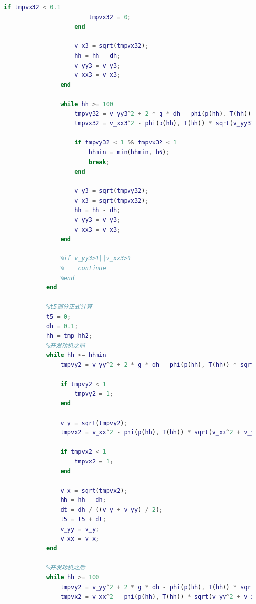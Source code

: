 \documentclass[hyperref,a4paper,UTF8]{ctexart}
\begin{document}
\begin{lstlisting}[language=Matlab]
                    if tmpvx32 < 0.1
                        tmpvx32 = 0;
                    end

                    v_x3 = sqrt(tmpvx32);
                    hh = hh - dh;
                    v_yy3 = v_y3;
                    v_xx3 = v_x3;
                end

                while hh >= 100
                    tmpvy32 = v_yy3^2 + 2 * g * dh - phi(p(hh), T(hh)) * sqrt(v_yy3^2 + v_xx3^2) * S_floor * dh * v_yy3 / (m - m_floor - m_para - m_hide) - 2 * 7500 * dh * v_yy3 / ((m - m_floor - m_para - m_hide) * sqrt(v_yy3^2 + v_xx3^2));
                    tmpvx32 = v_xx3^2 - phi(p(hh), T(hh)) * sqrt(v_yy3^2 + v_xx3^2) * S_floor * dh * v_xx3^2 / (v_yy3 * (m - m_floor - m_para - m_hide)) - 2 * 7500 * dh * v_xx3^2 / (v_yy3 * sqrt(v_yy3^2 + v_xx3^2) * (m - m_floor - m_para - m_hide));

                    if tmpvy32 < 1 && tmpvx32 < 1
                        hhmin = min(hhmin, h6);
                        break;
                    end

                    v_y3 = sqrt(tmpvy32);
                    v_x3 = sqrt(tmpvx32);
                    hh = hh - dh;
                    v_yy3 = v_y3;
                    v_xx3 = v_x3;
                end

                %if v_yy3>1||v_xx3>0
                %    continue
                %end
            end

            %t5部分正式计算
            t5 = 0;
            dh = 0.1;
            hh = tmp_hh2;
            %开发动机之前
            while hh >= hhmin
                tmpvy2 = v_yy^2 + 2 * g * dh - phi(p(hh), T(hh)) * sqrt(v_yy^2 + v_xx^2) * (S_floor + S_para) * dh * v_yy / (m - m_floor - m_para - m_hide);

                if tmpvy2 < 1
                    tmpvy2 = 1;
                end

                v_y = sqrt(tmpvy2);
                tmpvx2 = v_xx^2 - phi(p(hh), T(hh)) * sqrt(v_xx^2 + v_yy^2) * (S_floor + S_para) * dh * v_xx^2 / ((m - m_floor - m_para - m_hide) * v_yy);

                if tmpvx2 < 1
                    tmpvx2 = 1;
                end

                v_x = sqrt(tmpvx2);
                hh = hh - dh;
                dt = dh / ((v_y + v_yy) / 2);
                t5 = t5 + dt;
                v_yy = v_y;
                v_xx = v_x;
            end

            %开发动机之后
            while hh >= 100
                tmpvy2 = v_yy^2 + 2 * g * dh - phi(p(hh), T(hh)) * sqrt(v_yy^2 + v_xx^2) * S_floor * dh * v_yy / (m - m_floor - m_para - m_hide) - 2 * 7500 * dh * v_yy / ((m - m_floor - m_para - m_hide) * sqrt(v_yy^2 + v_xx^2));
                tmpvx2 = v_xx^2 - phi(p(hh), T(hh)) * sqrt(v_yy^2 + v_xx^2) * S_floor * dh * v_xx^2 / (v_yy * (m - m_floor - m_para - m_hide)) - 2 * 7500 * dh * v_xx^2 / (v_yy * sqrt(v_yy^2 + v_xx^2) * (m - m_floor - m_para - m_hide));


\end{lstlisting}
\end{document}
